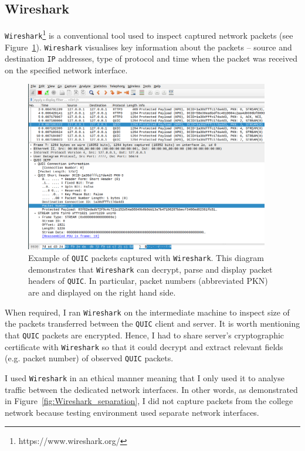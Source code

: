 \documentclass[12pt,a4paper,twoside,openright]{report}
\begin{document}
\subsection{Wireshark}

\texttt{Wireshark}\footnote{https://www.wireshark.org/} is a conventional tool used to inspect captured network packets (see Figure~\ref{fig:Wireshark_screenshot}).
\texttt{Wireshark} visualises key information about the packets -- source and destination \texttt{IP} addresses, type of protocol and time when the packet was received on the specified network interface.

    \begin{figure}[H]
    \centering
    \includegraphics[width=0.95\textwidth]{figs/Wireshark_screenshot.png}
    \caption[Example of \texttt{QUIC} packets captured with \texttt{Wireshark}]{Example of \texttt{QUIC} packets captured with \texttt{Wireshark}. This diagram demonstrates that \texttt{Wireshark} can decrypt, parse and display packet headers of \texttt{QUIC}. In particular, packet numbers (abbreviated PKN) are and displayed on the right hand side.}
    \label{fig:Wireshark_screenshot}
    \end{figure}
    
When required, I ran \texttt{Wireshark} on the intermediate machine to inspect size of the packets transferred between the \texttt{QUIC} client and server.
It is worth mentioning that \texttt{QUIC} packets are encrypted.
Hence, I had to share server's cryptographic certificate with \texttt{Wireshark} so that it could decrypt and extract relevant fields (e.g. packet number) of observed \texttt{QUIC} packets.

I used \texttt{Wireshark} in an ethical manner meaning that I only used it to analyse traffic between the dedicated network interfaces.
In other words, as demonstrated in Figure~\ref{fig:Wireshark_separation}, I did not capture packets from the college network because testing environment used separate network interfaces. 
\end{document}
